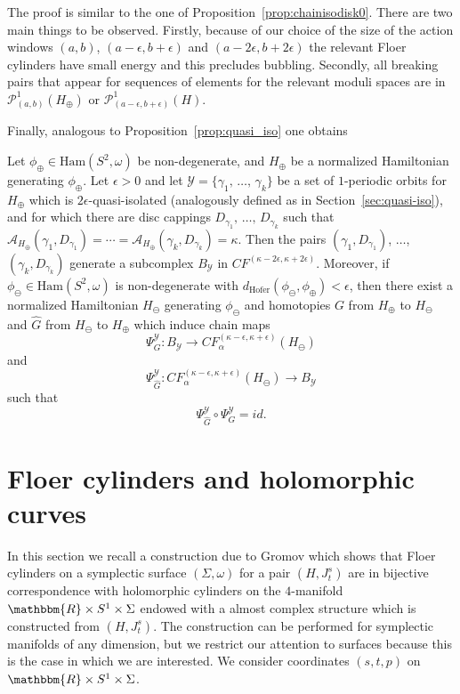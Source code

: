 \documentclass[AHL,Unicode,longabstracts,published]{cedram}
\newcommand{\id}{id}
\newcommand{\R}{\mathbbm{R}}
\newcommand{\Ham}{\mathrm{Ham}}
\newcommand{\hofer}{\mathrm{Hofer}}
\newcommand{\clP}{\mathcal{P}}
\newcommand{\clY}{\mathcal{Y}}
\newcommand{\clA}{\mathcal{A}}
\newcommand{\hofer}{\mathrm{Hofer}}
\begin{document}
The proof is similar to the one of Proposition~\ref{prop:chainisodisk0}. There are two main things to be observed. Firstly, because of our choice of the size of the action windows $(a,b)$, $(a-\epsilon,b+\epsilon)$ and $(a-2\epsilon,b+2\epsilon)$ the relevant Floer cylinders have small energy and this precludes bubbling. Secondly, all breaking pairs that appear for sequences of elements for the relevant moduli spaces are in $\clP^1_{(a,b)}(H_\oplus)$ or $\clP^1_{(a-\epsilon,b+\epsilon)}(H)$.


Finally, analogous to Proposition~\ref{prop:quasi_iso} one obtains

\begin{prop}\label{prop:quasi-isoS}
Let $\phi_{\oplus} \in \Ham(S^2, \omega)$ be non-degenerate, and $H_{\oplus}$ be a normalized Hamiltonian generating $\phi_{\oplus}$. Let $\epsilon>0$ and let $\clY=\{\gamma_1,\, \ldots,\, \gamma_k\}$ be a set of $1$-periodic orbits for $H_{\oplus}$ which is $2\epsilon$-quasi-isolated (analogously defined as in Section~\ref{sec:quasi-iso}), and for which there are disc cappings $D_{\gamma_1}, \,\ldots,\, D_{\gamma_k}$ such that $\clA_{H_{\oplus}}(\gamma_1, D_{\gamma_1}) = \cdots = \clA_{H_{\oplus}}(\gamma_k, D_{\gamma_k})= \kappa$. Then the pairs $(\gamma_1, D_{\gamma_1})$, $\ldots$, $(\gamma_k, D_{\gamma_k})$ generate a subcomplex ${B}_{\clY}$ in $CF^{(\kappa-2\epsilon,\kappa+2\epsilon)}$. Moreover, if $\phi_{\ominus} \in \Ham(S^2, \omega)$ is non-degenerate with $d_{\hofer}(\phi_{\ominus}, \phi_{\oplus})< \epsilon$, then there exist a normalized Hamiltonian $H_{\ominus}$ generating $\phi_{\ominus}$ and homotopies $G$ from $H_{\oplus}$ to $H_{\ominus}$ and $\widehat{G}$ from $H_{\ominus}$ to $H_{\oplus}$ which induce chain maps
\[
\Psi^{\clY}_G: {B}_{\clY} \to CF_{\alpha}^{(\kappa-\epsilon,\kappa+\epsilon)}(H_{\ominus})
\]
and
\[
\Psi^{\clY}_{\widehat{G}}: CF_{\alpha}^{(\kappa-\epsilon,\kappa+\epsilon)}(H_{\ominus})\to {B}_{\clY}
\]
such that
\[
\Psi^{\clY}_{\widehat{G}}\circ \Psi^{\clY}_{{G}} = \id.
\]
\end{prop}



\section{Floer cylinders and holomorphic curves} \label{sec:holcylinders}

In this section we recall a construction due to Gromov which shows that Floer cylinders on a symplectic surface $(\Sigma, \omega)$ for a pair $(H,J^s_t)$ are in bijective correspondence with holomorphic cylinders on the $4$-manifold $\R \times S^1 \times \Sigma$ endowed with a almost complex structure which is constructed from $(H,J^s_t)$. The construction can be performed for symplectic manifolds of any dimension, but we restrict our attention to surfaces because this is the case in which we are interested. We consider coordinates $(s,t,p) $ on $\R \times S^1 \times \Sigma$.
\end{document}
